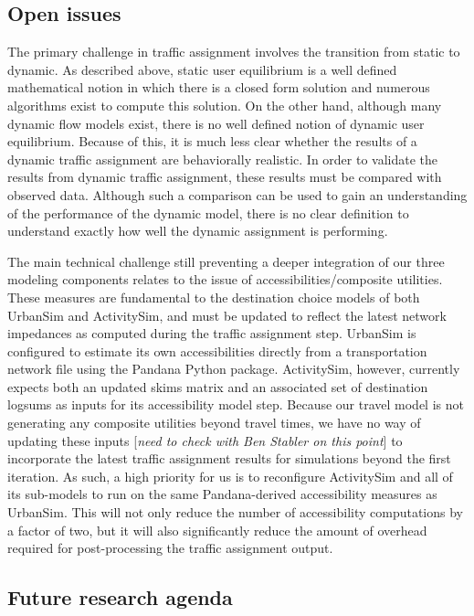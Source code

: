 \subsection{Open issues}
The primary challenge in traffic assignment involves the transition from static to dynamic. As described above, static user equilibrium is a well defined mathematical notion in which there is a closed form solution and numerous algorithms exist to compute this solution. On the other hand, although many dynamic flow models exist, there is no well defined notion of dynamic user equilibrium. Because of this, it is much less clear whether the results of a dynamic traffic assignment are behaviorally realistic. In order to validate the results from dynamic traffic assignment, these results must be compared with observed data. Although such a comparison can be used to gain an understanding of the performance of the dynamic model, there is no clear definition to understand exactly how well the dynamic assignment is performing. 

The main technical challenge still preventing a deeper integration of our three modeling components relates to the issue of accessibilities/composite utilities. These measures are fundamental to the destination choice models of both UrbanSim and ActivitySim, and must be updated to reflect the latest network impedances as computed during the traffic assignment step. UrbanSim is configured to estimate its own accessibilities directly from a transportation network file using the Pandana Python package. ActivitySim, however, currently expects both an updated skims matrix and an associated set of destination logsums as inputs for its accessibility model step. Because our travel model is not generating any composite utilities beyond travel times, we have no way of updating these inputs [\textit{need to check with Ben Stabler on this point}] to incorporate the latest traffic assignment results for simulations beyond the first iteration. As such, a high priority for us is to reconfigure ActivitySim and all of its sub-models to run on the same Pandana-derived accessibility measures as UrbanSim. This will not only reduce the number of accessibility computations by a factor of two, but it will also significantly reduce the amount of overhead required for post-processing the traffic assignment output.


\subsection{Future research agenda}


